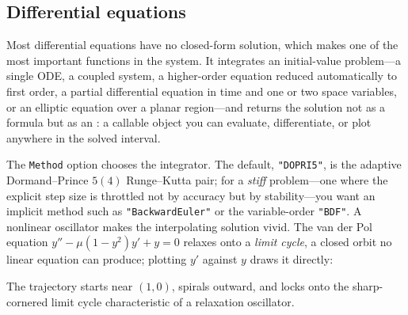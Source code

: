 \subsection{Differential equations}
\label{ssec:ndsolve}

Most differential equations have no closed-form solution, which makes  one of the most important functions in the system. It integrates an initial-value
problem---a single ODE, a coupled system, a higher-order equation reduced automatically to first order,
a partial differential equation in time and one or two space variables, or an elliptic
equation over a planar region---and returns the solution not as a formula but as an
: a callable object
you can evaluate, differentiate, or plot anywhere in the solved interval.

\begin{codepairs}
\end{codepairs}


The \texttt{Method} option chooses the integrator. The default, \texttt{"DOPRI5"}, is the adaptive
Dormand--Prince \(5(4)\) Runge--Kutta pair; for a
\emph{stiff} problem---one where the explicit step size is throttled not by accuracy but by stability---you
want an implicit method such as \texttt{"BackwardEuler"} or the variable-order \texttt{"BDF"}. A nonlinear
oscillator makes the interpolating solution vivid. The van der Pol equation \(y'' - \mu(1-y^2)y' + y = 0\)
relaxes onto a \emph{limit cycle}, a closed orbit no linear equation can produce; plotting \(y'\) against
\(y\) draws it directly:


The trajectory starts near \((1,0)\), spirals outward, and locks onto the sharp-cornered limit cycle
characteristic of a relaxation oscillator.


